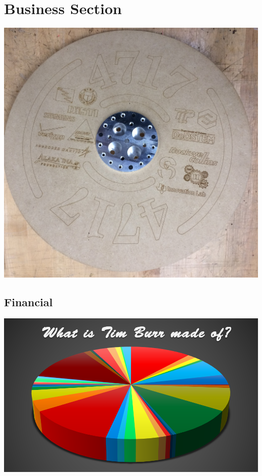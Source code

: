 \documentclass[
letterpaper, %
11pt, %
onecolumn, %
openany, %
]{report}
\begin{document}
\cleardoublepage
\part{Business Section}
\vspace{3em}
\begin{minipage}[c]{\linewidth}
\centering
\includegraphics[width=\linewidth]{Images/Main/Big_wheel.JPG}
\end{minipage}



                                            
\chapter{Financial}
\vspace{3em}
\begin{minipage}[c]{\linewidth}
\centering
\includegraphics[width=\linewidth]{Images/Main/finance_cover_pic.png}
\end{minipage}
\end{document}
